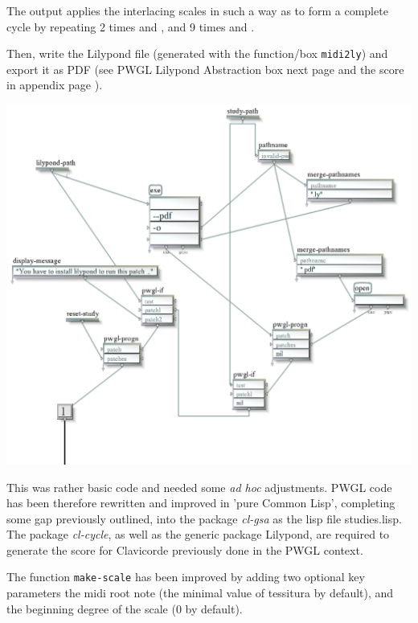 \smallskip

The output \textcolor{gray}{} applies the interlacing scales in such a way as to form a complete cycle by repeating 2 times \textcolor{gray}{} and \textcolor{gray}{}, and 9 times \textcolor{gray}{} and \textcolor{gray}{}.  

\bigskip

Then, \textcolor{gray}{} write the Lilypond file (generated with the function/box \texttt{midi2ly}) and export it as PDF (see PWGL Lilypond Abstraction box next page and the score in appendix page \pageref{clav}).

{
\begin{center}
\includegraphics[width=\textwidth]{mp/img/lilypond-abs}
\end{center}
\vspace{-6mm}
} 

This was rather basic code and needed some \textit{ad hoc }adjustments. PWGL code has been therefore rewritten and improved in 'pure Common Lisp', completing some gap previously outlined, into the package \textit{cl-gsa} as the lisp file \textsf{studies.lisp}. The package \textit{cl-cycle}, as well as the generic package Lilypond, are required to generate the score for Clavicorde previously done in the PWGL context.

\bigskip
The function \texttt{make-scale} has been improved by adding two optional key parameters the midi root note (the minimal value of tessitura by default), and the beginning degree of the scale (0 by default).

